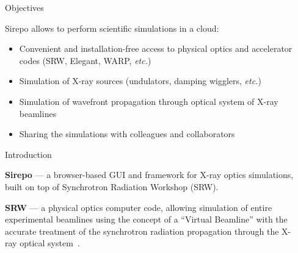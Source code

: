 \documentclass[final]{beamer}
\newlength{\sepwid}
\newlength{\onecolwid}
\begin{document}
\begin{frame}[t] %

\begin{columns}[t] %

\begin{column}{\sepwid}\end{column} %

\begin{column}{\onecolwid} %


\begin{alertblock}{Objectives}

Sirepo allows to perform scientific simulations in a cloud:
\begin{itemize}
  \item Convenient and installation-free access to physical optics and accelerator codes (SRW, Elegant, WARP, \textit{etc.})
  \item Simulation of X-ray sources (undulators, damping wigglers, \textit{etc.})
  \item Simulation of wavefront propagation through optical system of X-ray beamlines
  \item Sharing the simulations with colleagues and collaborators
\end{itemize}

\end{alertblock}



\begin{block}{\faInfoCircle{} Introduction}

\textbf{Sirepo} --- a browser-based GUI and framework for X-ray optics simulations, built on top of Synchrotron Radiation Workshop (SRW).

\vspace{1cm}

\textbf{SRW} --- a physical optics computer code, allowing simulation of entire experimental beamlines using the concept of a ``Virtual Beamline'' with the accurate treatment of the synchrotron radiation propagation through the X-ray optical system~\cite{Chubar1998_SRW, Chubar2002_SRW, Chubar2013_SRW}.
\end{block}


\end{column}
\end{columns}
\end{frame}
\end{document}
